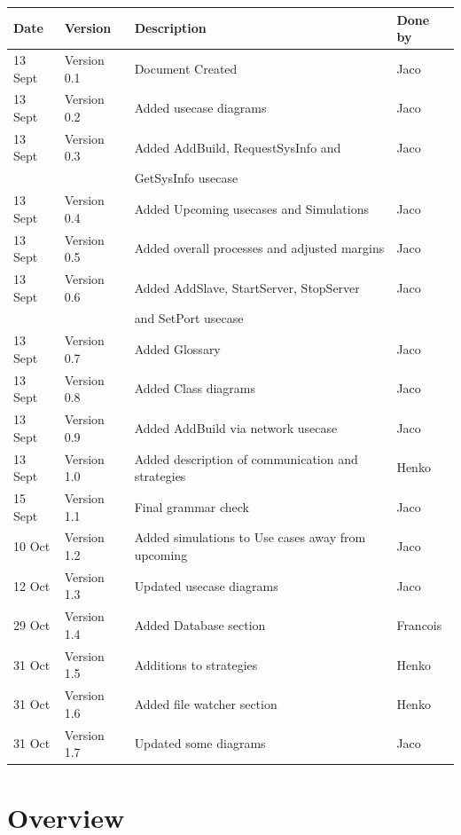 \documentclass[a4paper,12pt,final]{article}
\begin{document}
\begin{tabular}{|l|l|l|l|}
\hline
\textbf{Date} & \textbf{Version} & \textbf{Description} & \textbf{Done by}\\
\hline
13 Sept & Version 0.1 & Document Created & Jaco\\
\hline
13 Sept & Version 0.2 & Added usecase diagrams & Jaco\\
\hline
13 Sept & Version 0.3 & Added AddBuild, RequestSysInfo and  & Jaco\\
&&GetSysInfo usecase&\\
\hline
13 Sept & Version 0.4 & Added Upcoming usecases and Simulations & Jaco\\
\hline
13 Sept & Version 0.5 & Added overall processes and adjusted margins & Jaco\\
\hline
13 Sept & Version 0.6 & Added AddSlave, StartServer, StopServer  & Jaco\\
&&and SetPort usecase&\\
\hline
13 Sept & Version 0.7 & Added Glossary & Jaco\\
\hline
13 Sept & Version 0.8 & Added Class diagrams & Jaco\\
\hline
13 Sept & Version 0.9 & Added AddBuild via network usecase & Jaco\\
\hline
13 Sept & Version 1.0 & Added description of communication and strategies & Henko\\
\hline
15 Sept & Version 1.1 & Final grammar check & Jaco\\
\hline
10 Oct & Version 1.2 & Added simulations to Use cases away from upcoming & Jaco\\
\hline
12 Oct & Version 1.3 & Updated usecase diagrams & Jaco\\
\hline
29 Oct & Version 1.4 & Added Database section & Francois\\
\hline
31 Oct & Version 1.5 & Additions to strategies & Henko\\
\hline
31 Oct & Version 1.6 & Added file watcher section & Henko\\
\hline
31 Oct & Version 1.7 & Updated some diagrams & Jaco\\
\hline
\end{tabular}
\newpage
\tableofcontents
\thispagestyle{empty}
\newpage

\section{Overview}
\end{document}

